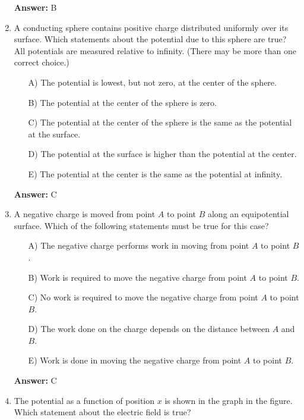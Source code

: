 \begin{enumerate}
\textbf{Answer:} B

\item A conducting sphere contains positive charge distributed uniformly over its surface. Which statements about the potential due to this sphere are true? All potentials are measured relative to infinity. (There may be more than one correct choice.)

\begin{itemize}
    \item[A)] The potential is lowest, but not zero, at the center of the sphere.
    \item[B)] The potential at the center of the sphere is zero.
    \item[C)] The potential at the center of the sphere is the same as the potential at the surface.
    \item[D)] The potential at the surface is higher than the potential at the center.
    \item[E)] The potential at the center is the same as the potential at infinity.
\end{itemize}

\textbf{Answer:} C

\item A negative charge is moved from point $A$ to point $B$ along an equipotential surface. Which of the following statements must be true for this case?

\begin{itemize}
    \item[A)] The negative charge performs work in moving from point $A$ to point $B$.

\item[B)] Work is required to move the negative charge from point $A$ to point $B$.

\item[C)] No work is required to move the negative charge from point $A$ to point $B$.

\item[D)] The work done on the charge depends on the distance between $A$ and $B$.

\item[E)] Work is done in moving the negative charge from point $A$ to point $B$.
\end{itemize}

\textbf{Answer:} C

\item The potential as a function of position $x$ is shown in the graph in the figure. Which statement about the electric field is true?


\end{enumerate}
